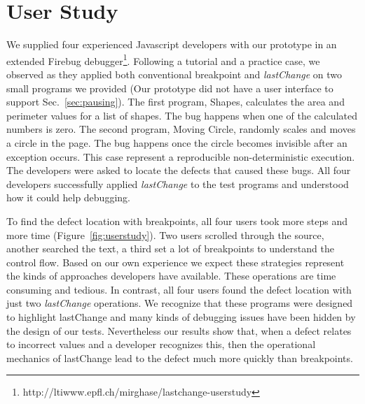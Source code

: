 \documentclass{sig-alternate}
\begin{document}


\section{User Study}
We supplied four experienced Javascript developers with our prototype in an 
extended Firebug debugger\footnote[4]{http://ltiwww.epfl.ch/\texttildelow mirghase/lastchange-userstudy}. Following a tutorial and a practice case, we observed as they 
applied both conventional breakpoint and \textit{lastChange} on two small programs we 
provided (Our prototype did not have a user interface to support Sec.~\ref{sec:pausing}).
The first program, Shapes, calculates the area and perimeter values for a list of shapes. The bug happens when one of the calculated numbers is zero. The second program, Moving Circle, randomly scales and moves a circle in the page. The bug happens once the circle becomes invisible after an exception
occurs. This case represent a reproducible non-deterministic execution. The developers were asked to locate the defects that caused these bugs. All four developers successfully applied \textit{lastChange} to the test programs 
and understood how it could help debugging. 

To find the defect location with breakpoints, all four users took more steps and more time (Figure~\ref{fig:userstudy}).  
Two users scrolled through the source, 
another searched the text, a third set a lot of breakpoints to understand the control flow. 
Based on our own experience we expect these strategies represent the kinds of approaches 
developers have available. These operations are time consuming and tedious. In contrast, all four users 
found the defect location with just two \textit{lastChange} operations.
We recognize that these programs were designed to highlight lastChange and many kinds of debugging 
issues have been hidden by the design of our tests. Nevertheless our results show that, when a defect 
relates to incorrect values and a developer recognizes this, then the operational 
mechanics of lastChange lead to the defect much more quickly than breakpoints.
\end{document}
